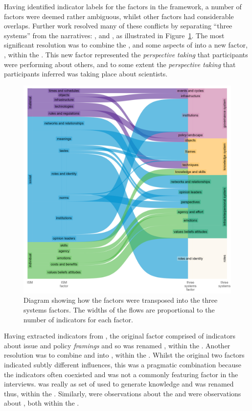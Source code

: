 Having identified indicator labels for the factors in the \ISM{} framework, a number of factors were deemed rather ambiguous, whilst other factors had considerable overlaps. Further work resolved many of these conflicts by separating ``three systems'' from the narratives: \skiinte, \skiknow{} and \skiscip, as illustrated in Figure~\ref{fig:resski}. The most significant resolution was to combine the \ISM{} \ismsn, \ismst{} and some aspects of \ismsm{} into a new factor, \skipers, within the \skiinte. This new factor represented the \emph{perspective taking} that participants were performing about others, and to some extent the \emph{perspective taking} that participants inferred was taking place about scientists. 

\begin{figure}[!ht]
    \centering
    \includegraphics[width=1\linewidth]{figures/ISM_to_threesystems.png}
    \caption{Diagram showing how the \ISM{} factors were transposed into the three systems factors. The widths of the flows are proportional to the number of indicators for each factor.}
    \label{fig:resski}
\end{figure}

Having extracted \skipers{} indicators from \ismsm, the original \ISM{} factor comprised of indicators about issue and policy \emph{framings} and so was renamed \skifram, within the \skiknow. Another resolution was to combine \ISM{} \ismic{} and \ismia{} into \skiagen, within the \skiinte. Whilst the original two factors indicated subtly different influences, this was a pragmatic combination because the indicators often coexisted and \ismic{} was not a commonly featuring factor in the interviews. \ISM{} \ismmt{} was really as set of \skitech{} used to generate knowledge and was renamed thus, within the \skiknow. Similarly, \ISM{} \ismmr{} were observations about the \skipoli{} and \ismmts{} were observations about \skieven{}, both within the \skiscip.

